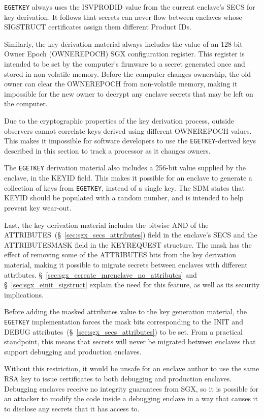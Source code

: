 \texttt{EGETKEY} always uses the ISVPRODID value from the current enclave's
SECS for key derivation. It follows that secrets can never flow between
enclaves whose SIGSTRUCT certificates assign them different Product IDs.

Similarly, the key derivation material always includes the value of an 128-bit
Owner Epoch (OWNEREPOCH) SGX configuration register. This register is intended
to be set by the computer's firmware to a secret generated once and stored in
non-volatile memory. Before the computer changes ownership, the old owner can
clear the OWNEREPOCH from non-volatile memory, making it impossible for the new
owner to decrypt any enclave secrets that may be left on the computer.

Due to the cryptographic properties of the key derivation process, outside
observers cannot correlate keys derived using different OWNEREPOCH values. This
makes it impossible for software developers to use the \texttt{EGETKEY}-derived
keys described in this section to track a processor as it changes owners.

The \texttt{EGETKEY} derivation material also includes a 256-bit value supplied
by the enclave, in the KEYID field. This makes it possible for an enclave to
generate a collection of keys from \texttt{EGETKEY}, instead of a single key.
The SDM states that KEYID should be populated with a random number, and is
intended to help prevent key wear-out.

Last, the key derivation material includes the bitwise AND of the
ATTRIBUTES~(\S~\ref{sec:sgx_secs_attributes}) field in the enclave's SECS and
the ATTRIBUTESMASK field in the KEYREQUEST structure. The mask has the effect
of removing some of the ATTRIBUTES bits from the key derivation material,
making it possible to migrate secrets between enclaves with different
attributes. \S~\ref{sec:sgx_ecreate_mrenclave_no_attributes} and
\S~\ref{sec:sgx_einit_sigstruct} explain the need for this feature, as well as
its security implications.

Before adding the masked attributes value to the key generation material, the
\texttt{EGETKEY} implementation forces the mask bits corresponding to the
INIT and DEBUG attributes~(\S~\ref{sec:sgx_secs_attributes}) to be set. From a
practical standpoint, this means that secrets will never be migrated between
enclaves that support debugging and production enclaves.

Without this restriction, it would be unsafe for an enclave author to use the
same RSA key to issue certificates to both debugging and production enclaves.
Debugging enclaves receive no integrity guarantees from SGX, so it is possible
for an attacker to modify the code inside a debugging enclave in a way that
causes it to disclose any secrets that it has access to.
